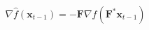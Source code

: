\documentclass[border=2pt,varwidth]{standalone}
\begin{document}
\[
 \nabla \hat{f} (\mathbf{x}_{t-1}) =
  -\mathbf{F} \nabla f (\mathbf{F}^* \mathbf{x}_{t-1})
\]
\end{document}
